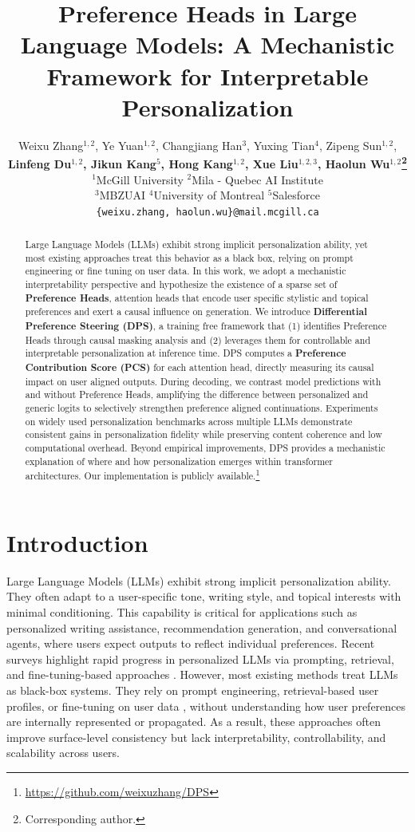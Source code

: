 \documentclass[11pt]{article}
\title{Preference Heads in Large Language Models:
A Mechanistic Framework for Interpretable Personalization}
\author{%
  Weixu Zhang$^{1,2}$, Ye Yuan$^{1,2}$, Changjiang Han$^{3}$, Yuxing Tian$^{4}$, Zipeng Sun$^{1,2}$,\\  \textbf{Linfeng Du$^{1,2}$, Jikun Kang$^{5}$, Hong Kang$^{1,2}$, Xue Liu$^{1,2,3}$, Haolun Wu$^{1,2}$\thanks{Corresponding author.}}\\
  $^1$McGill University 
  $^2$Mila - Quebec AI Institute \\
  $^3$MBZUAI 
  $^4$University of Montreal
  $^5$Salesforce\\
  \texttt{\{weixu.zhang, haolun.wu\}@mail.mcgill.ca} \\
}
\begin{document}
\maketitle


\begin{abstract}

Large Language Models (LLMs) exhibit strong implicit personalization ability, yet most existing approaches treat this behavior as a black box, relying on prompt engineering or fine tuning on user data. In this work, we adopt a mechanistic interpretability perspective and hypothesize the existence of a sparse set of \textbf{Preference Heads}, attention heads that encode user specific stylistic and topical preferences and exert a causal influence on generation. We introduce \textbf{Differential Preference Steering (DPS)}, a training free framework that (1) identifies Preference Heads through causal masking analysis and (2) leverages them for controllable and interpretable personalization at inference time. DPS computes a \textbf{Preference Contribution Score (PCS)} for each attention head, directly measuring its causal impact on user aligned outputs. During decoding, we contrast model predictions with and without Preference Heads, amplifying the difference between personalized and generic logits to selectively strengthen preference aligned continuations. Experiments on widely used personalization benchmarks across multiple LLMs demonstrate consistent gains in personalization fidelity while preserving content coherence and low computational overhead. Beyond empirical improvements, DPS provides a mechanistic explanation of where and how personalization emerges within transformer architectures. Our implementation is publicly available.\footnote{\url{https://github.com/weixuzhang/DPS}}


\end{abstract}


\section{Introduction}

Large Language Models (LLMs) exhibit strong implicit personalization ability.
They often adapt to a user-specific tone, writing style, and topical interests with minimal conditioning.
This capability is critical for applications such as personalized writing assistance, recommendation generation, and conversational agents, where users expect outputs to reflect individual preferences.
Recent surveys highlight rapid progress in personalized LLMs via prompting, retrieval, and fine-tuning-based approaches \cite{DBLP:journals/corr/abs-2502-11528}.
However, most existing methods treat LLMs as black-box systems.
They rely on prompt engineering, retrieval-based user profiles, or fine-tuning on user data \cite{DBLP:conf/acl/SalemiMBZ24,DBLP:journals/corr/abs-2407-11016,DBLP:conf/iclr/ChenZLCL25}, without understanding how user preferences are internally represented or propagated.
As a result, these approaches often improve surface-level consistency but lack interpretability, controllability, and scalability across users.
\end{document}
